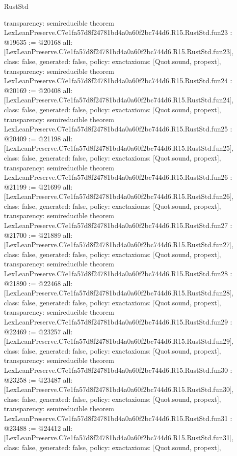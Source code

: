 \begin{lexlean}{RustStd}
\begin{coremodule}
{  transparency: semireducible
}
theorem LexLeanPreserve.C7e1fa57d8f24781bd4a0a60f2bc744d6.R15.RustStd.fun23 : @19635 := @20168 {
  all: [LexLeanPreserve.C7e1fa57d8f24781bd4a0a60f2bc744d6.R15.RustStd.fun23],
  class: false,
  generated: false,
  policy: exact{axioms: [Quot.sound, propext]},
  transparency: semireducible
}
theorem LexLeanPreserve.C7e1fa57d8f24781bd4a0a60f2bc744d6.R15.RustStd.fun24 : @20169 := @20408 {
  all: [LexLeanPreserve.C7e1fa57d8f24781bd4a0a60f2bc744d6.R15.RustStd.fun24],
  class: false,
  generated: false,
  policy: exact{axioms: [Quot.sound, propext]},
  transparency: semireducible
}
theorem LexLeanPreserve.C7e1fa57d8f24781bd4a0a60f2bc744d6.R15.RustStd.fun25 : @20409 := @21198 {
  all: [LexLeanPreserve.C7e1fa57d8f24781bd4a0a60f2bc744d6.R15.RustStd.fun25],
  class: false,
  generated: false,
  policy: exact{axioms: [Quot.sound, propext]},
  transparency: semireducible
}
theorem LexLeanPreserve.C7e1fa57d8f24781bd4a0a60f2bc744d6.R15.RustStd.fun26 : @21199 := @21699 {
  all: [LexLeanPreserve.C7e1fa57d8f24781bd4a0a60f2bc744d6.R15.RustStd.fun26],
  class: false,
  generated: false,
  policy: exact{axioms: [Quot.sound, propext]},
  transparency: semireducible
}
theorem LexLeanPreserve.C7e1fa57d8f24781bd4a0a60f2bc744d6.R15.RustStd.fun27 : @21700 := @21889 {
  all: [LexLeanPreserve.C7e1fa57d8f24781bd4a0a60f2bc744d6.R15.RustStd.fun27],
  class: false,
  generated: false,
  policy: exact{axioms: [Quot.sound, propext]},
  transparency: semireducible
}
theorem LexLeanPreserve.C7e1fa57d8f24781bd4a0a60f2bc744d6.R15.RustStd.fun28 : @21890 := @22468 {
  all: [LexLeanPreserve.C7e1fa57d8f24781bd4a0a60f2bc744d6.R15.RustStd.fun28],
  class: false,
  generated: false,
  policy: exact{axioms: [Quot.sound, propext]},
  transparency: semireducible
}
theorem LexLeanPreserve.C7e1fa57d8f24781bd4a0a60f2bc744d6.R15.RustStd.fun29 : @22469 := @23257 {
  all: [LexLeanPreserve.C7e1fa57d8f24781bd4a0a60f2bc744d6.R15.RustStd.fun29],
  class: false,
  generated: false,
  policy: exact{axioms: [Quot.sound, propext]},
  transparency: semireducible
}
theorem LexLeanPreserve.C7e1fa57d8f24781bd4a0a60f2bc744d6.R15.RustStd.fun30 : @23258 := @23487 {
  all: [LexLeanPreserve.C7e1fa57d8f24781bd4a0a60f2bc744d6.R15.RustStd.fun30],
  class: false,
  generated: false,
  policy: exact{axioms: [Quot.sound, propext]},
  transparency: semireducible
}
theorem LexLeanPreserve.C7e1fa57d8f24781bd4a0a60f2bc744d6.R15.RustStd.fun31 : @23488 := @24412 {
  all: [LexLeanPreserve.C7e1fa57d8f24781bd4a0a60f2bc744d6.R15.RustStd.fun31],
  class: false,
  generated: false,
  policy: exact{axioms: [Quot.sound, propext]},
}
\end{coremodule}
\end{lexlean}
